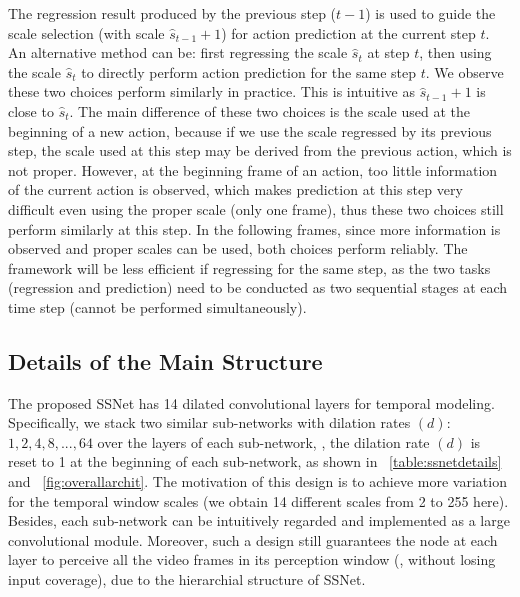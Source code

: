 \documentclass[10pt,twocolumn,letterpaper]{article}
\begin{document}
The regression result produced by the previous step ($t-1$) is used to guide the scale selection (with scale $\hat{s}_{t-1}+1$)
for action prediction at the current step $t$.
An alternative method can be: first regressing the scale $\hat{s}_{t}$ at step $t$,
then using the scale $\hat{s}_{t}$ to directly perform action prediction for the same step $t$.
We observe these two choices perform similarly in practice.
This is intuitive as $\hat{s}_{t-1}+1$ is close to $\hat{s}_{t}$.
The main difference of these two choices is the scale used at the beginning of a new action,
because if we use the scale regressed by its previous step, the scale used at this step may be derived from the previous action, which is not proper.
However, at the beginning frame of an action, too little information of the current action is observed,
which makes prediction at this step very difficult even using the proper scale (only one frame),
thus these two choices still perform similarly at this step.
In the following frames, since more information is observed and proper scales can be used, both choices perform reliably.
The framework will be less efficient if regressing for the same step,
as the two tasks (regression and prediction) need to be conducted as two sequential stages at each time step (cannot be performed simultaneously).





























\subsection{Details of the Main Structure}

The proposed SSNet has 14 dilated convolutional layers for temporal modeling.
Specifically, we stack two similar sub-networks with dilation rates $(d):$ {$1,2,4,8,...,64$} over the layers of each sub-network,
\ie, the dilation rate $(d)$ is reset to 1 at the beginning of each sub-network, as shown in \tablename{~\ref{table:ssnetdetails}} and \figurename{~\ref{fig:overallarchit}}.
The motivation of this design is to achieve more variation for the temporal window scales (we obtain 14 different scales from 2 to 255 here).
Besides, each sub-network can be intuitively regarded and implemented as a large convolutional module.
Moreover, such a design still guarantees the node at each layer to perceive all the video frames in its perception window (\ie, without losing input coverage),
due to the hierarchial structure of SSNet.
\end{document}

